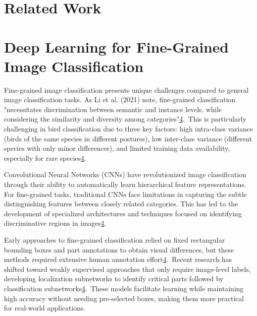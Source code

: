 \documentclass[a4paper,12pt]{article}
\begin{document}
   
\newpage
\section{Related Work}


\section*{Deep Learning for Fine-Grained Image Classification}
Fine-grained image classification presents unique challenges compared to general image classification tasks. As Li et al. (2021) note, fine-grained classification "necessitates discrimination between semantic and instance levels, while considering the similarity and diversity among categories"\href{https://www.frontiersin.org/journals/neurorobotics/articles/10.3389/fnbot.2024.1391791/full}{4}. This is particularly challenging in bird classification due to three key factors: high intra-class variance (birds of the same species in different postures), low inter-class variance (different species with only minor differences), and limited training data availability, especially for rare species\href{https://www.frontiersin.org/journals/neurorobotics/articles/10.3389/fnbot.2024.1391791/full}{4}.

Convolutional Neural Networks (CNNs) have revolutionized image classification through their ability to automatically learn hierarchical feature representations. For fine-grained tasks, traditional CNNs face limitations in capturing the subtle distinguishing features between closely related categories. This has led to the development of specialized architectures and techniques focused on identifying discriminative regions in images\href{https://www.frontiersin.org/journals/neurorobotics/articles/10.3389/fnbot.2024.1391791/full}{4}.

Early approaches to fine-grained classification relied on fixed rectangular bounding boxes and part annotations to obtain visual differences, but these methods required extensive human annotation effort\href{https://www.frontiersin.org/journals/neurorobotics/articles/10.3389/fnbot.2024.1391791/full}{4}. Recent research has shifted toward weakly supervised approaches that only require image-level labels, developing localization subnetworks to identify critical parts followed by classification subnetworks\href{https://www.frontiersin.org/journals/neurorobotics/articles/10.3389/fnbot.2024.1391791/full}{4}. These models facilitate learning while maintaining high accuracy without needing pre-selected boxes, making them more practical for real-world applications.
\end{document}
